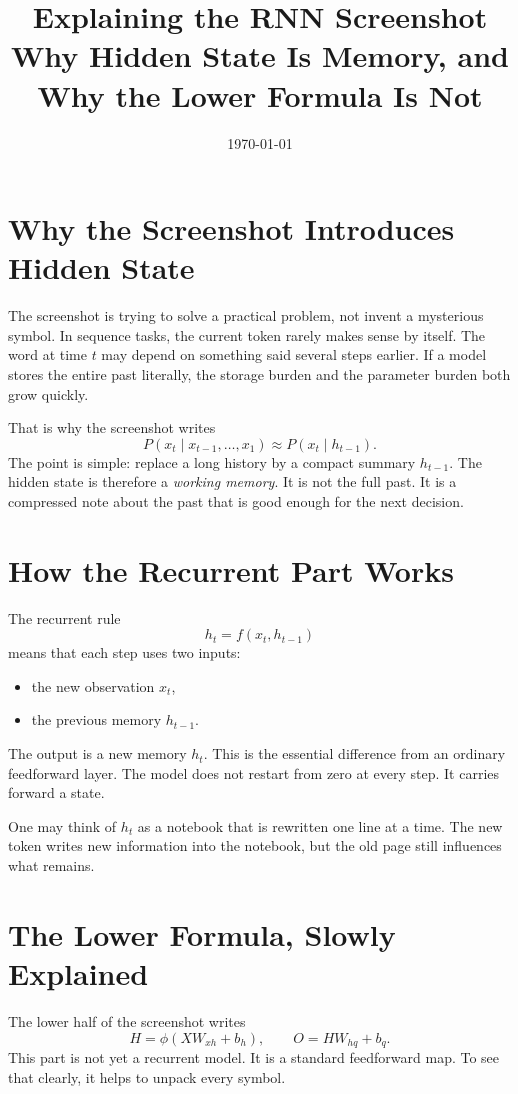 \documentclass[12pt,a4paper]{article}
\title{Explaining the RNN Screenshot\\
\large Why Hidden State Is Memory, and Why the Lower Formula Is Not}
\author{}
\date{\today}
\begin{document}
\maketitle
\tableofcontents

\section{Why the Screenshot Introduces Hidden State}

The screenshot is trying to solve a practical problem, not invent a mysterious symbol. In sequence tasks, the current token rarely makes sense by itself. The word at time \(t\) may depend on something said several steps earlier. If a model stores the entire past literally, the storage burden and the parameter burden both grow quickly.

That is why the screenshot writes
\[
P(x_t \mid x_{t-1}, \ldots, x_1) \approx P(x_t \mid h_{t-1}).
\]
The point is simple: replace a long history by a compact summary \(h_{t-1}\). The hidden state is therefore a \emph{working memory}. It is not the full past. It is a compressed note about the past that is good enough for the next decision.

\section{How the Recurrent Part Works}

The recurrent rule
\[
h_t = f(x_t, h_{t-1})
\]
means that each step uses two inputs:
\begin{itemize}
  \item the new observation \(x_t\),
  \item the previous memory \(h_{t-1}\).
\end{itemize}

The output is a new memory \(h_t\). This is the essential difference from an ordinary feedforward layer. The model does not restart from zero at every step. It carries forward a state.

One may think of \(h_t\) as a notebook that is rewritten one line at a time. The new token writes new information into the notebook, but the old page still influences what remains.

\section{The Lower Formula, Slowly Explained}

The lower half of the screenshot writes
\[
H = \phi(XW_{xh} + b_h), \qquad O = HW_{hq} + b_q.
\]
This part is not yet a recurrent model. It is a standard feedforward map. To see that clearly, it helps to unpack every symbol.
\end{document}
